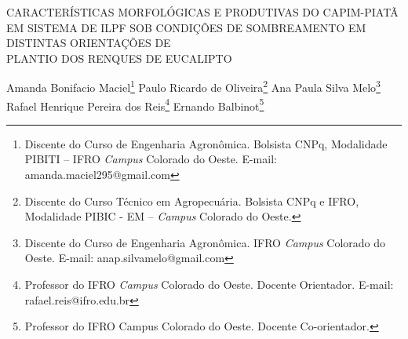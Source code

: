 \documentclass[article,12pt,onesidea,4paper,english,brazil]{abntex2}
\begin{document}
	
	
	\frenchspacing 
	
	\begin{center}
		\Large CARACTERÍSTICAS MORFOLÓGICAS E PRODUTIVAS DO CAPIM-PIATÃ EM
		SISTEMA DE ILPF SOB CONDIÇÕES DE SOMBREAMENTO EM DISTINTAS
		ORIENTAÇÕES DE \\PLANTIO DOS RENQUES DE EUCALIPTO
		
		\normalsize
		Amanda Bonifacio Maciel\footnote{Discente do Curso de Engenharia Agronômica. Bolsista CNPq, Modalidade PIBITI – IFRO \textit{Campus} Colorado do Oeste. E-mail: amanda.maciel295@gmail.com} 
		Paulo Ricardo de Oliveira\footnote{Discente do Curso Técnico em Agropecuária. Bolsista CNPq e IFRO, Modalidade PIBIC - EM – \textit{Campus} Colorado do Oeste.} 
		Ana Paula Silva Melo\footnote{Discente do Curso de Engenharia Agronômica. IFRO \textit{Campus} Colorado do Oeste. E-mail: anap.silvamelo@gmail.com} \\
		Rafael Henrique Pereira dos Reis\footnote{Professor do IFRO \textit{Campus} Colorado do Oeste. Docente Orientador. E-mail: rafael.reis@ifro.edu.br}
		Ernando Balbinot\footnote{Professor do IFRO Campus Colorado do Oeste. Docente Co-orientador.} 
	\end{center}
	
\end{document}
